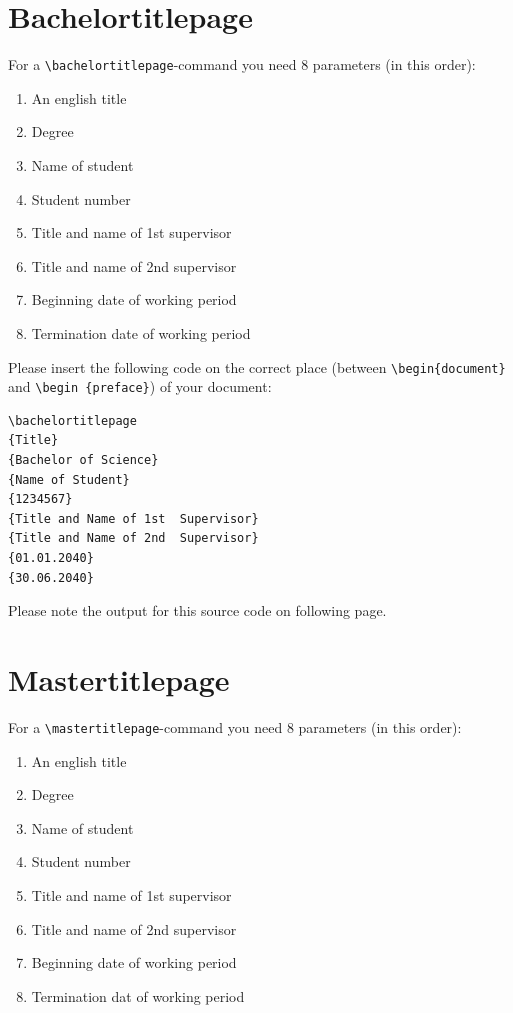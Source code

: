 \documentclass[ trackchanges, hyperref, pdf, mp, mppdf, en]{wise}
\newcommand\code[1]{\texttt{#1}}
\newcommand\command[1]{\code{\textbackslash{}#1}}
\begin{document}
\begin{appendix}
\begin{appendices}
\section{Bachelortitlepage}\label{sec:titelblatt_bachelorarbeiten}

For a \command{bachelortitlepage}-command you need 8 parameters (in this order): 

\begin{enumerate}
\item An english title
\item Degree
\item Name of student
\item Student number
\item Title and name of 1st supervisor
\item Title and name of 2nd supervisor
\item Beginning date of working period
\item Termination date of working period
\end{enumerate}

Please insert the following code on the correct place (between \command{begin\{document\} } and \command{begin \{preface\}}) of your document:

\lstlatex 

\begin{lstlisting}
\bachelortitlepage
{Title}
{Bachelor of Science}
{Name of Student}
{1234567}
{Title and Name of 1st  Supervisor}
{Title and Name of 2nd  Supervisor}
{01.01.2040}
{30.06.2040}
\end{lstlisting} 

Please note the output for this source code on following page.



\clearpage


\section{Mastertitlepage}\label{sec:titelblatt_masterarbeiten}

For a \command{mastertitlepage}-command you need 8 parameters (in this order): 

\begin{enumerate}
\item An english title
\item Degree
\item Name of student
\item Student number
\item Title and name of 1st supervisor
\item Title and name of 2nd supervisor
\item Beginning date of working period
\item Termination dat of working period
\end{enumerate}


\end{appendices}
\end{appendix}
\end{document}
